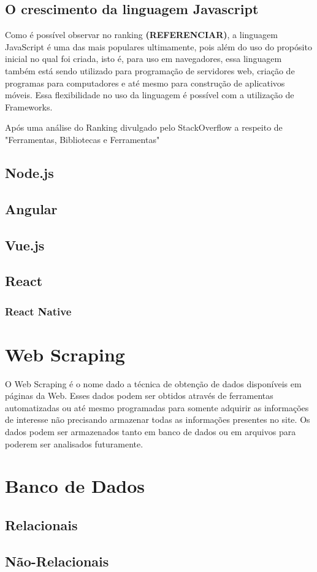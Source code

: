 \subsection{O crescimento da linguagem Javascript}

Como é possível observar no ranking \textbf{(REFERENCIAR)}, a linguagem JavaScript é uma das mais populares ultimamente, pois além do uso do propósito inicial no qual foi criada, isto é, para uso em navegadores, essa linguagem também está sendo utilizado para programação de servidores web, criação de programas para computadores e até mesmo para construção de aplicativos móveis. Essa flexibilidade no uso da linguagem é possível com a utilização de Frameworks.


Após uma análise do Ranking divulgado pelo StackOverflow a respeito de "Ferramentas, Bibliotecas e Ferramentas"

\subsection{Node.js}

\subsection{Angular}

\subsection{Vue.js}

\subsection{React}

\subsubsection{React Native} \label{React Native}

\section{Web Scraping}

O Web Scraping é o nome dado a técnica de obtenção de dados disponíveis em páginas da Web. Esses dados podem ser obtidos através de ferramentas automatizadas ou até mesmo programadas para somente adquirir as informações de interesse não precisando armazenar todas as informações presentes no site.
Os dados podem ser armazenados tanto em banco de dados ou em arquivos para poderem ser analisados futuramente.


\section{Banco de Dados}

\subsection{Relacionais}

\subsection{Não-Relacionais}